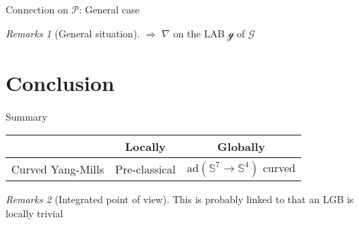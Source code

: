 \documentclass[hyperref={pdfpagelabels=false}]{beamer}
\def\ba#1\ea{\begin{align}#1\end{align}}
\theoremstyle{plain}
\theoremstyle{remark}
\newtheorem*{remark}{Remarks}
\begin{document}
{\begin{frame}{Connection on $\mathcal{P}$: General case}
\begin{minipage}[]{0.5\textwidth}
\begin{remark}[General situation]
	$\Rightarrow$ $\nabla$ on the LAB $\mathcal{g}$ of $\mathcal{G}$
	\end{remark}
	\end{minipage}
\end{frame}
%
%
%
%
%

\section{Conclusion}
{
\begin{frame}{Summary}
\begin{table}[h!]
		\begin{tabularx}{\textwidth}{X| c c} 
			\rowcolor{gray}
			& Locally & Globally \\ \hline
			Curved Yang-Mills & Pre-classical & $\mathrm{ad}(\mathds{S}^7 \to \mathds{S}^4)$ curved 
		\end{tabularx}
\end{table}
\begin{remark}[Integrated point of view]
This is probably linked to that an LGB is locally trivial 


\end{remark}
\end{frame}}}
\end{document}
